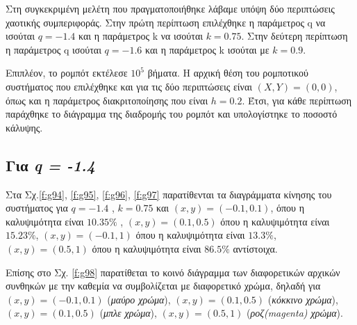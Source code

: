 Στη συγκεκριμένη μελέτη που πραγματοποιήθηκε λάβαμε υπόψη δύο περιπτώσεις χαοτικής συμπεριφοράς.
Στην πρώτη περίπτωση επιλέχθηκε η παράμετρος q να ισούται $q = -1.4$ και η παράμετρος k να ισούται $k = 0.75$. Στην δεύτερη περίπτωση  η παράμετρος q ισούται $q = -1.6$ και η παράμετρος k ισούται με $k = 0.9$. 

Επιπλέον, το ρομπότ εκτέλεσε $10^5$ βήματα. Η αρχική θέση του ρομποτικού συστήματος που επιλέχθηκε και για τις δύο περιπτώσεις είναι  $(X,Y) = (0,0)$, όπως και η παράμετρος διακριτοποίησης που είναι $h = 0.2$. Έτσι, για κάθε περίπτωση παράχθηκε το διάγραμμα της διαδρομής του ρομπότ και υπολογίστηκε το ποσοστό κάλυψης.

\subsection{Για \emph{q = -1.4}}

Στα Σχ.\ref{f:g94}, \ref{f:g95}, \ref{f:g96}, \ref{f:g97} παρατίθενται τα διαγράμματα κίνησης του συστήματος για $q =-1.4$ , $k = 0.75$ και $(x,y) = (-0.1,0.1)$, όπου η καλυψιμότητα είναι $10.35\%$ , $(x,y) = (0.1,0.5)$ όπου η καλυψιμότητα είναι $15.23\%$, $(x,y) = (-0.1,1)$ όπου η καλυψιμότητα είναι $13.3\%$, $(x,y) = (0.5,1)$ όπου η καλυψιμότητα είναι $86.5\%$ αντίστοιχα.

Επίσης στο Σχ. \ref{f:g98} παρατίθεται το κοινό διάγραμμα των διαφορετικών αρχικών συνθηκών με την καθεμία να συμβολίζεται με διαφορετικό χρώμα, δηλαδή για $(x,y) = (-0.1,0.1)$ (\emph{μαύρο χρώμα}), $(x,y) = (0.1,0.5)$ (\emph{κόκκινο χρώμα}), $(x,y) = (0.1,0.5)$ (\emph{μπλε χρώμα}), $(x,y) = (0.5,1)$ (\emph{ροζ(magenta) χρώμα}).

